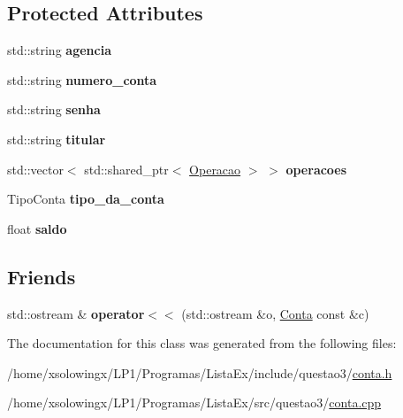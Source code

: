 \subsection*{Protected Attributes}
\begin{DoxyCompactItemize}
\item 
\mbox{\label{classConta_a0e0e322eae287419ad9a6a240a1a6da7}} 
std\+::string {\bfseries agencia}
\item 
\mbox{\label{classConta_aac9f75d95a6dceb3d187ffa5bc57f199}} 
std\+::string {\bfseries numero\+\_\+conta}
\item 
\mbox{\label{classConta_ab121ceb2a3148f85dfc70835482a00eb}} 
std\+::string {\bfseries senha}
\item 
\mbox{\label{classConta_adf5a21c3c3e8bcd7e2eddfa45b8309e8}} 
std\+::string {\bfseries titular}
\item 
\mbox{\label{classConta_a64e730e4e21e877cdf0f15b9120c31cb}} 
std\+::vector$<$ std\+::shared\+\_\+ptr$<$ \hyperlink{classOperacao}{Operacao} $>$ $>$ {\bfseries operacoes}
\item 
\mbox{\label{classConta_afd9e6b0e5caca532e4d1ee39cf788d5b}} 
Tipo\+Conta {\bfseries tipo\+\_\+da\+\_\+conta}
\item 
\mbox{\label{classConta_a0eedc43379194352bb6d117e2d58b9ad}} 
float {\bfseries saldo}
\end{DoxyCompactItemize}
\subsection*{Friends}
\begin{DoxyCompactItemize}
\item 
\mbox{\label{classConta_a476b15f634990aaa823054868f60b976}} 
std\+::ostream \& {\bfseries operator$<$$<$} (std\+::ostream \&o, \hyperlink{classConta}{Conta} const \&c)
\end{DoxyCompactItemize}


The documentation for this class was generated from the following files\+:\begin{DoxyCompactItemize}
\item 
/home/xsolowingx/\+L\+P1/\+Programas/\+Lista\+Ex/include/questao3/\hyperlink{conta_8h}{conta.\+h}\item 
/home/xsolowingx/\+L\+P1/\+Programas/\+Lista\+Ex/src/questao3/\hyperlink{conta_8cpp}{conta.\+cpp}\end{DoxyCompactItemize}
